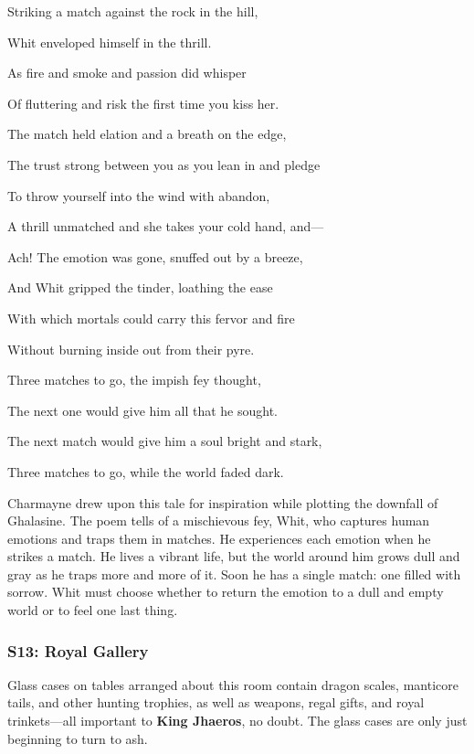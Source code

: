 \documentclass[10pt,a4paper,twoside,bg=print,twocolumn,openany,nodeprecatedcode]{dndbook}
\begin{document}
\begin{DndReadAloud}{}
Striking a match against the rock in the hill,

Whit enveloped himself in the thrill.

As fire and smoke and passion did whisper

Of fluttering and risk the first time you kiss her.

The match held elation and a breath on the edge,

The trust strong between you as you lean in and pledge

To throw yourself into the wind with abandon,

A thrill unmatched and she takes your cold hand, and—

Ach! The emotion was gone, snuffed out by a breeze,

And Whit gripped the tinder, loathing the ease

With which mortals could carry this fervor and fire

Without burning inside out from their pyre.

Three matches to go, the impish fey thought,

The next one would give him all that he sought.

The next match would give him a soul bright and stark,

Three matches to go, while the world faded dark.

\end{DndReadAloud}

Charmayne drew upon this tale for inspiration while plotting the downfall of Ghalasine. The poem tells of a mischievous fey, Whit, who captures human emotions and traps them in matches. He experiences each emotion when he strikes a match. He lives a vibrant life, but the world around him grows dull and gray as he traps more and more of it. Soon he has a single match: one filled with sorrow. Whit must choose whether to return the emotion to a dull and empty world or to feel one last thing.

\subsubsection{S13: Royal Gallery}
\begin{DndReadAloud}{}
Glass cases on tables arranged about this room contain dragon scales, manticore tails, and other hunting trophies, as well as weapons, regal gifts, and royal trinkets—all important to \textbf{King Jhaeros}, no doubt. The glass cases are only just beginning to turn to ash.

\end{DndReadAloud}
\end{document}
